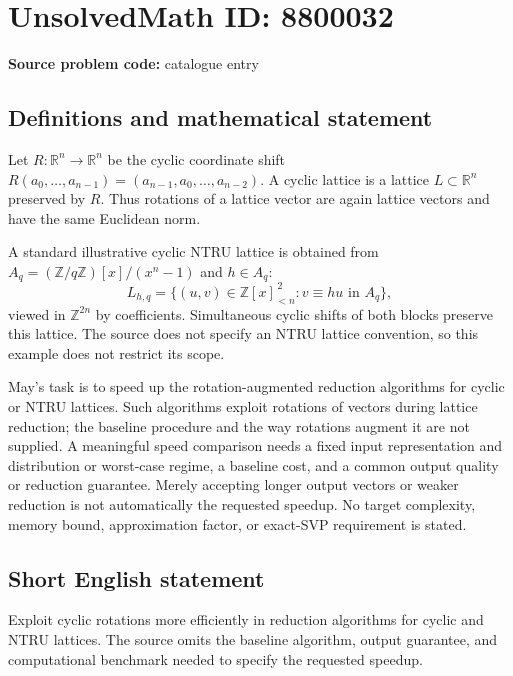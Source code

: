 \documentclass[11pt]{article}
\newcommand{\Z}{\mathbb{Z}}
\newcommand{\R}{\mathbb{R}}
\begin{document}
\section*{UnsolvedMath ID: 8800032}
\textbf{Source problem code:} catalogue entry
\subsection{Definitions and mathematical statement}
Let \(R:\R^n\to\R^n\) be the cyclic coordinate shift \(R(a_0,\ldots,a_{n-1})=(a_{n-1},a_0,\ldots,a_{n-2})\). A cyclic lattice is a lattice \(L\subset\R^n\) preserved by \(R\). Thus rotations of a lattice vector are again lattice vectors and have the same Euclidean norm.

A standard illustrative cyclic NTRU lattice is obtained from \(A_q=(\Z/q\Z)[x]/(x^n-1)\) and \(h\in A_q\):
\[
 L_{h,q}=\{(u,v)\in\Z[x]_{<n}^{\,2}:v\equiv hu\text{ in }A_q\},
\]
viewed in \(\Z^{2n}\) by coefficients. Simultaneous cyclic shifts of both blocks preserve this lattice. The source does not specify an NTRU lattice convention, so this example does not restrict its scope.

May's task is to speed up the rotation-augmented reduction algorithms for cyclic or NTRU lattices. Such algorithms exploit rotations of vectors during lattice reduction; the baseline procedure and the way rotations augment it are not supplied. A meaningful speed comparison needs a fixed input representation and distribution or worst-case regime, a baseline cost, and a common output quality or reduction guarantee. Merely accepting longer output vectors or weaker reduction is not automatically the requested speedup. No target complexity, memory bound, approximation factor, or exact-SVP requirement is stated.
\subsection{Short English statement}
Exploit cyclic rotations more efficiently in reduction algorithms for cyclic and NTRU lattices. The source omits the baseline algorithm, output guarantee, and computational benchmark needed to specify the requested speedup.
\end{document}
